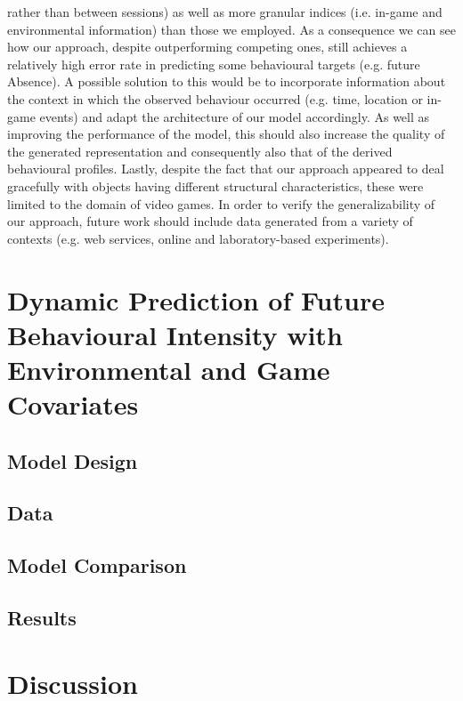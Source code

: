 rather than between sessions) as well as more granular indices (i.e. in-game and environmental information) than those we employed. As a consequence we can see how our approach, despite outperforming competing ones, still achieves a relatively high error rate in predicting some behavioural targets (e.g. future Absence). A possible solution to this would be to incorporate information about the context in which the observed behaviour occurred (e.g. time, location or in-game events) and adapt the architecture of our model accordingly. As well as improving the performance of the model, this should also increase the quality of the generated representation and consequently also that of the derived behavioural profiles. Lastly, despite the fact that our approach appeared to deal gracefully  with objects having different structural characteristics, these were limited to the domain of video games. In order to verify the generalizability of our approach, future work should include data generated from a variety of contexts (e.g. web services, online and laboratory-based experiments).

\section{Dynamic Prediction of Future Behavioural Intensity with Environmental and Game Covariates}
\label{model_architecture_1}
\lorem

\subsection{Model Design}


\subsection{Data}
\lorem

\subsection{Model Comparison}
\lorem

\subsection{Results}
\lorem


\section{Discussion}
\lorem